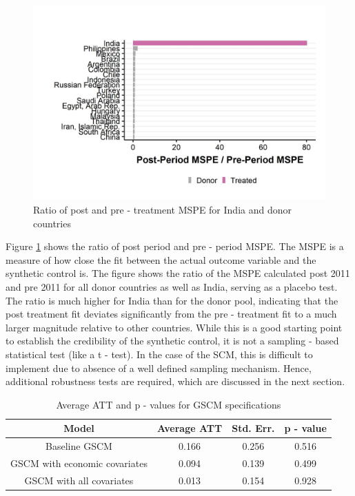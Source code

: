 \documentclass[12pt,nobind, a4paper]{reedthesis}
\begin{document}
 \begin{figure}

 {\centering \includegraphics[width=1\linewidth]{figure/msperatio} 

 }

 \caption{Ratio of post and pre - treatment MSPE for India and donor countries}\label{fig:msper}
 \end{figure}
 Figure \ref{fig:msper} shows the ratio of post period and pre - period MSPE. The MSPE is a measure of how close the fit between the actual outcome variable and the synthetic control is. The figure shows the ratio of the MSPE calculated post 2011 and pre 2011 for all donor countries as well as India, serving as a placebo test. The ratio is much higher for India than for the donor pool, indicating that the post treatment fit deviates significantly from the pre - treatment fit to a much larger magnitude relative to other countries. While this is a good starting point to establish the credibility of the synthetic control, it is not a sampling - based statistical test (like a t - test). In the case of the SCM, this is difficult to implement due to absence of a well defined sampling mechanism. Hence, additional robustness tests are required, which are discussed in the next section.
 \begin{table}[h!!]
 \centering
 \begin{tabular}{cccc}
 \hline
 Model & Average ATT & Std. Err. & p - value\\
 \hline
 Baseline GSCM&0.166& 0.256 & 0.516\\
 \hline
 GSCM with economic covariates & 0.094 & 0.139 & 0.499\\
 \hline
 GSCM with all covariates & 0.013 & 0.154 & 0.928\\
 \hline
 \end{tabular}
 \caption{ Average ATT and p - values for GSCM specifications}
 \end{table}
\end{document}
